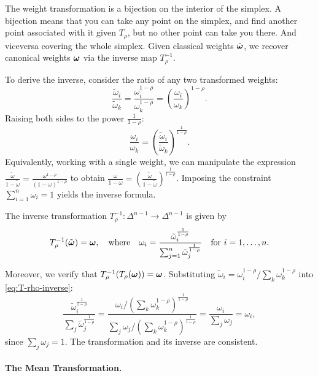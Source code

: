The weight transformation is a bijection on the interior of the simplex. A bijection means that you can take any point on the simplex, and find another point associated with it given $T_\rho$, but no other point can take you there. And viceversa covering the whole simplex. 
Given classical weights $\tilde{\boldsymbol{\omega}}$, we recover canonical weights $\boldsymbol{\omega}$ via the inverse map $T_\rho^{-1}$.

To derive the inverse, consider the ratio of any two transformed weights:
\[
\frac{\tilde{\omega}_i}{\tilde{\omega}_k} = \frac{\omega_i^{1-\rho}}{\omega_k^{1-\rho}} = \left( \frac{\omega_i}{\omega_k} \right)^{1-\rho}.
\]
Raising both sides to the power $\frac{1}{1-\rho}$:
\[
\frac{\omega_i}{\omega_k} = \left( \frac{\tilde{\omega}_i}{\tilde{\omega}_k} \right)^{\frac{1}{1-\rho}}.
\]
Equivalently, working with a single weight, we can manipulate the expression $\frac{\tilde{\omega}}{1-\tilde{\omega}} = \frac{\omega^{1-\rho}}{(1-\omega)^{1-\rho}}$ to obtain $\frac{\omega}{1-\omega} = \left(\frac{\tilde{\omega}}{1-\tilde{\omega}}\right)^{\frac{1}{1-\rho}}$. Imposing the constraint $\sum_{i=1}^n \omega_i = 1$ yields the inverse formula.

\begin{proposition}
\label{prop:inverse-weight}
The inverse transformation $T_\rho^{-1}: \Delta^{n-1} \to \Delta^{n-1}$ is given by
\begin{equation}
\label{eq:T-rho-inverse}
T_\rho^{-1}(\tilde{\boldsymbol{\omega}}) = \boldsymbol{\omega}, \quad \text{where} \quad \omega_i = \frac{\tilde{\omega}_i^{\frac{1}{1-\rho}}}{\sum_{j=1}^{n} \tilde{\omega}_j^{\frac{1}{1-\rho}}} \quad \text{for } i = 1, \ldots, n.
\end{equation}
\end{proposition}

Moreover, we verify that $T_\rho^{-1}(T_\rho(\boldsymbol{\omega})) = \boldsymbol{\omega}$. Substituting $\tilde{\omega}_i = \omega_i^{1-\rho} / \sum_k \omega_k^{1-\rho}$ into \cref{eq:T-rho-inverse}:
\[
\frac{\tilde{\omega}_i^{\frac{1}{1-\rho}}}{\sum_j \tilde{\omega}_j^{\frac{1}{1-\rho}}} = \frac{\omega_i / (\sum_k \omega_k^{1-\rho})^{\frac{1}{1-\rho}}}{\sum_j \omega_j / (\sum_k \omega_k^{1-\rho})^{\frac{1}{1-\rho}}} = \frac{\omega_i}{\sum_j \omega_j} = \omega_i,
\]
since $\sum_j \omega_j = 1$. The transformation and its inverse are consistent.

\paragraph{The Mean Transformation.}

